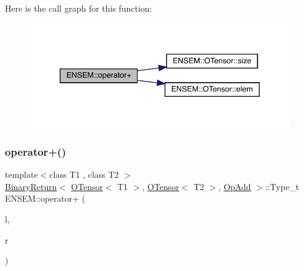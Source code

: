 Here is the call graph for this function\+:\nopagebreak
\begin{figure}[H]
\begin{center}
\leavevmode
\includegraphics[width=338pt]{de/d87/group__obstensor_ga1b7029ac61e62bdd191703e814e622b3_cgraph}
\end{center}
\end{figure}
\mbox{\label{group__obstensor_gad61499ec3fe572c419aa5143ef37d965}} 
\subsubsection{\texorpdfstring{operator+()}{operator+()}\hspace{0.1cm}{\footnotesize\ttfamily [2/4]}}
{\footnotesize\ttfamily template$<$class T1 , class T2 $>$ \\
\mbox{\hyperlink{structENSEM_1_1BinaryReturn}{Binary\+Return}}$<$ \mbox{\hyperlink{classENSEM_1_1OTensor}{O\+Tensor}}$<$ T1 $>$, \mbox{\hyperlink{classENSEM_1_1OTensor}{O\+Tensor}}$<$ T2 $>$, \mbox{\hyperlink{structENSEM_1_1OpAdd}{Op\+Add}} $>$\+::Type\+\_\+t E\+N\+S\+E\+M\+::operator+ (\begin{DoxyParamCaption}\item[{const \mbox{\hyperlink{classENSEM_1_1OTensor}{O\+Tensor}}$<$ T1 $>$ \&}]{l,  }\item[{const \mbox{\hyperlink{classENSEM_1_1OTensor}{O\+Tensor}}$<$ T2 $>$ \&}]{r }\end{DoxyParamCaption})\hspace{0.3cm}{\ttfamily [inline]}}

